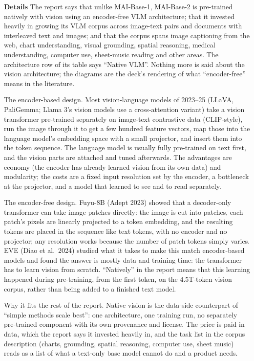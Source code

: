 \documentclass[11pt,letterpaper]{article}
\newcommand{\para}[1]{\medskip\noindent\textbf{#1}\quad}
\begin{document}
\para{Details} The report says that unlike MAI-Base-1, MAI-Base-2 is pre-trained natively with vision using an encoder-free VLM architecture; that it invested heavily in growing its VLM corpus across image-text pairs and documents with interleaved text and images; and that the corpus spans image captioning from the web, chart understanding, visual grounding, spatial reasoning, medical understanding, computer use, sheet-music reading and other areas. The architecture row of its table says ``Native VLM''. Nothing more is said about the vision architecture; the diagrams are the deck's rendering of what ``encoder-free'' means in the literature.

The encoder-based design. Most vision-language models of 2023--25 (LLaVA, PaliGemma; Llama 3's vision models use a cross-attention variant) take a vision transformer pre-trained separately on image-text contrastive data (CLIP-style), run the image through it to get a few hundred feature vectors, map those into the language model's embedding space with a small projector, and insert them into the token sequence. The language model is usually fully pre-trained on text first, and the vision parts are attached and tuned afterwards. The advantages are economy (the encoder has already learned vision from its own data) and modularity; the costs are a fixed input resolution set by the encoder, a bottleneck at the projector, and a model that learned to see and to read separately.

The encoder-free design. Fuyu-8B (Adept 2023) showed that a decoder-only transformer can take image patches directly: the image is cut into patches, each patch's pixels are linearly projected to a token embedding, and the resulting tokens are placed in the sequence like text tokens, with no encoder and no projector; any resolution works because the number of patch tokens simply varies. EVE (Diao et al.\ 2024) studied what it takes to make this match encoder-based models and found the answer is mostly data and training time: the transformer has to learn vision from scratch. ``Natively'' in the report means that this learning happened during pre-training, from the first token, on the 4.5T-token vision corpus, rather than being added to a finished text model.

Why it fits the rest of the report. Native vision is the data-side counterpart of ``simple methods scale best'': one architecture, one training run, no separately pre-trained component with its own provenance and license. The price is paid in data, which the report says it invested heavily in, and the task list in the corpus description (charts, grounding, spatial reasoning, computer use, sheet music) reads as a list of what a text-only base model cannot do and a product needs.
\end{document}
